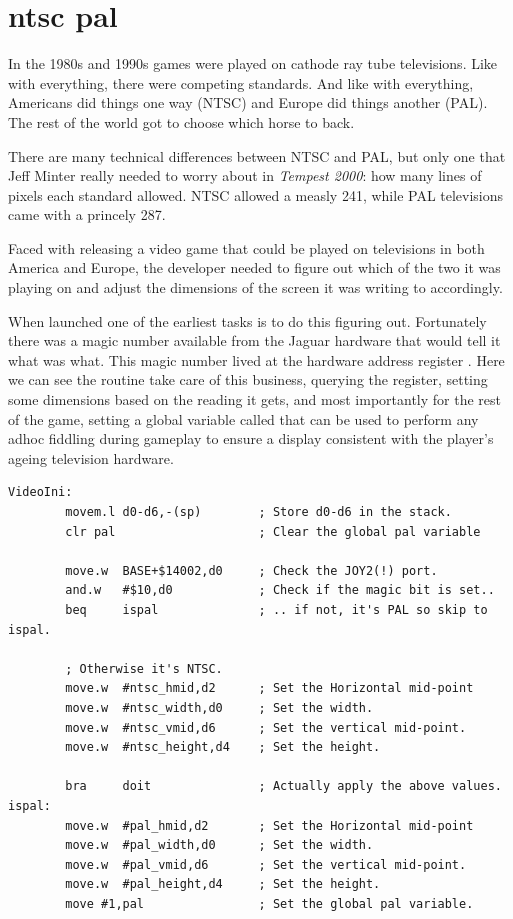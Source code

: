 \chapter{ntsc pal}
\label{sec:ntsc_pal}
\lhead[tempest 2000]{}
\lstset{style=68KStyle}

In the 1980s and 1990s games were played on cathode ray tube televisions. Like
with everything, there were competing standards. And like with everything, Americans
did things one way (NTSC) and Europe did things another (PAL). The rest of the world
got to choose which horse to back.

There are many technical differences between NTSC and PAL, but only one that Jeff Minter
really needed to worry about in \textit{Tempest 2000}: how many lines of pixels each
standard allowed. NTSC allowed a measly 241, while PAL televisions came with a princely 287.

Faced with releasing a video game that could be played on televisions in both America and Europe, 
the developer needed to figure out which of the two it was playing on and adjust the dimensions
of the screen it was writing to accordingly.

When launched one of the earliest tasks is to do this figuring out. Fortunately there was a 
magic number available from the Jaguar hardware that would tell it what was what. This magic
number lived at the hardware address register . Here we can see the 
routine take care of this business, querying the register, setting some dimensions based on the
reading it gets, and most importantly for the rest of the game, setting a global variable called
 that can be used to perform any adhoc fiddling during gameplay to ensure a display
consistent with the player's ageing television hardware.

\begin{lstlisting}
VideoIni:
        movem.l d0-d6,-(sp)        ; Store d0-d6 in the stack.
        clr pal                    ; Clear the global pal variable
    
        move.w  BASE+$14002,d0     ; Check the JOY2(!) port.
        and.w   #$10,d0            ; Check if the magic bit is set..
        beq     ispal              ; .. if not, it's PAL so skip to ispal.
    
        ; Otherwise it's NTSC.
        move.w  #ntsc_hmid,d2      ; Set the Horizontal mid-point
        move.w  #ntsc_width,d0     ; Set the width.
        move.w  #ntsc_vmid,d6      ; Set the vertical mid-point.
        move.w  #ntsc_height,d4    ; Set the height.
    
        bra     doit               ; Actually apply the above values.
ispal:
        move.w  #pal_hmid,d2       ; Set the Horizontal mid-point
        move.w  #pal_width,d0      ; Set the width.
        move.w  #pal_vmid,d6       ; Set the vertical mid-point.
        move.w  #pal_height,d4     ; Set the height.
        move #1,pal                ; Set the global pal variable.
\end{lstlisting}

